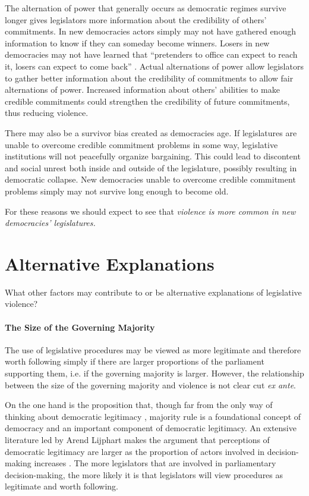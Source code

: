 \documentclass[a4paper]{article}\usepackage[]{graphicx}\usepackage[]{color}
\begin{document}
The alternation of power that generally occurs as democratic regimes survive longer gives legislators more information about the credibility of others' commitments. In new democracies actors simply may not have gathered enough information to know if they can someday become winners. Losers in new democracies may not have learned that ``pretenders to office can expect to reach it, losers can expect to come back'' \citep[][36]{Przeworski1991}. Actual alternations of power allow legislators to gather better information about the credibility of commitments to allow fair alternations of power. Increased information about others' abilities to make credible commitments could strengthen the credibility of future commitments, thus reducing violence.

There may also be a survivor bias created as democracies age. If legislatures are unable to overcome credible commitment problems in some way, legislative institutions will not peacefully organize bargaining. This could lead to discontent and social unrest both inside and outside of the legislature, possibly resulting in democratic collapse. New democracies unable to overcome credible commitment problems simply may not survive long enough to become old.

For these reasons we should expect to see that \emph{violence is more common in new democracies' legislatures.}

\section{Alternative Explanations}

What other factors may contribute to or be alternative explanations of legislative violence?

\paragraph{The Size of the Governing Majority}

The use of legislative procedures may be viewed as more legitimate and therefore worth following simply if there are larger proportions of the parliament supporting them, i.e. if the governing majority is larger. However, the relationship between the size of the governing majority and violence is not clear cut \emph{ex ante}.

On the one hand is the proposition that, though far from the only way of thinking about democratic legitimacy \cite{Follesdal2006}, majority rule is a foundational concept of democracy \citep{Dahl1989} and an important component of democratic legitimacy. An extensive literature led by Arend Lijphart makes the argument that perceptions of democratic legitimacy are larger as the proportion of actors involved in decision-making increases \citep[]{Lijphart2007}. The more legislators that are involved in parliamentary decision-making, the more likely it is that legislators will view procedures as legitimate and worth following.
\end{document}
